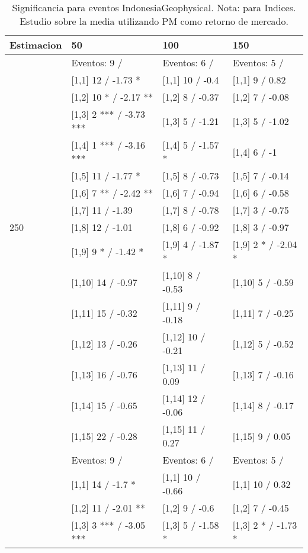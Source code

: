 \begin{table}

\caption{Significancia para eventos IndonesiaGeophysical. Nota: para Indices. Estudio sobre la media utilizando PM como retorno de mercado.}
\centering
\begin{tabular}[t]{llll}
\toprule
Estimacion & 50 & 100 & 150\\
\midrule
 & Eventos:  9 / & Eventos:  6 / & Eventos:  5 /\\
 & {}[1,1] 12  / -1.73 * & {}[1,1] 10  / -0.4 & {}[1,1] 9  / 0.82\\
 & {}[1,2] 10 * / -2.17 ** & {}[1,2] 8  / -0.37 & {}[1,2] 7  / -0.08\\
 & {}[1,3] 2 *** / -3.73 *** & {}[1,3] 5  / -1.21 & {}[1,3] 5  / -1.02\\
 & {}[1,4] 1 *** / -3.16 *** & {}[1,4] 5  / -1.57 * & {}[1,4] 6  / -1\\
\addlinespace
 & {}[1,5] 11  / -1.77 * & {}[1,5] 8  / -0.73 & {}[1,5] 7  / -0.14\\
 & {}[1,6] 7 ** / -2.42 ** & {}[1,6] 7  / -0.94 & {}[1,6] 6  / -0.58\\
 & {}[1,7] 11  / -1.39 & {}[1,7] 8  / -0.78 & {}[1,7] 3  / -0.75\\
250 & {}[1,8] 12  / -1.01 & {}[1,8] 6  / -0.92 & {}[1,8] 3  / -0.97\\
 & {}[1,9] 9 * / -1.42 * & {}[1,9] 4  / -1.87 * & {}[1,9] 2 * / -2.04 *\\
\addlinespace
 & {}[1,10] 14  / -0.97 & {}[1,10] 8  / -0.53 & {}[1,10] 5  / -0.59\\
 & {}[1,11] 15  / -0.32 & {}[1,11] 9  / -0.18 & {}[1,11] 7  / -0.25\\
 & {}[1,12] 13  / -0.26 & {}[1,12] 10  / -0.21 & {}[1,12] 5  / -0.52\\
 & {}[1,13] 16  / -0.76 & {}[1,13] 11  / 0.09 & {}[1,13] 7  / -0.16\\
 & {}[1,14] 15  / -0.65 & {}[1,14] 12  / -0.06 & {}[1,14] 8  / -0.17\\
\addlinespace
 & {}[1,15] 22  / -0.28 & {}[1,15] 11  / 0.27 & {}[1,15] 9  / 0.05\\
 & Eventos:  9 / & Eventos:  6 / & Eventos:  5 /\\
 & {}[1,1] 14  / -1.7 * & {}[1,1] 10  / -0.66 & {}[1,1] 10  / 0.32\\
 & {}[1,2] 11  / -2.01 ** & {}[1,2] 9  / -0.6 & {}[1,2] 7  / -0.45\\
 & {}[1,3] 3 *** / -3.05 *** & {}[1,3] 5  / -1.58 * & {}[1,3] 2 * / -1.73 *\\

\end{tabular}
\end{table}
